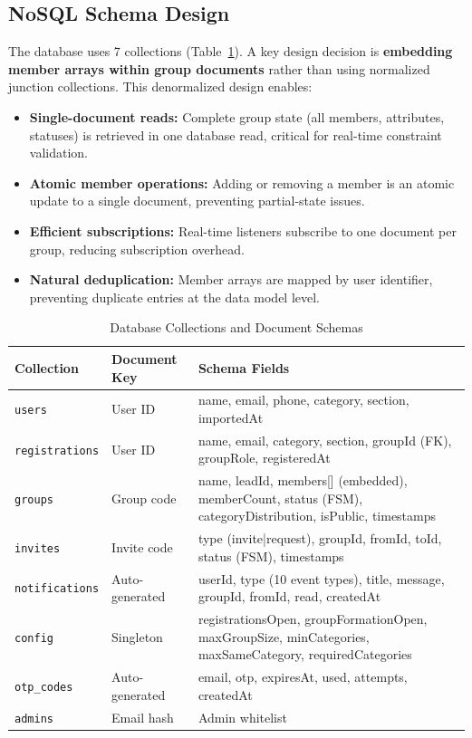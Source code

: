 \documentclass[11pt,a4paper]{article}
\theoremstyle{plain}
\theoremstyle{definition}
\theoremstyle{remark}
\begin{document}
\subsection{NoSQL Schema Design}

The database uses 7 collections (Table~\ref{tab:collections}). A key design decision is \textbf{embedding member arrays within group documents} rather than using normalized junction collections. This denormalized design enables:

\begin{itemize}[noitemsep,topsep=4pt]
    \item \textbf{Single-document reads:} Complete group state (all members, attributes, statuses) is retrieved in one database read, critical for real-time constraint validation.
    \item \textbf{Atomic member operations:} Adding or removing a member is an atomic update to a single document, preventing partial-state issues.
    \item \textbf{Efficient subscriptions:} Real-time listeners subscribe to one document per group, reducing subscription overhead.
    \item \textbf{Natural deduplication:} Member arrays are mapped by user identifier, preventing duplicate entries at the data model level.
\end{itemize}

\begin{table}[htbp]
\centering
\caption{Database Collections and Document Schemas}
\label{tab:collections}
\small
\renewcommand{\arraystretch}{1.15}
\begin{tabular}{@{}lp{2cm}p{5.5cm}@{}}
\toprule
\textbf{Collection} & \textbf{Document Key} & \textbf{Schema Fields} \\
\midrule
\texttt{users} & User ID & name, email, phone, category, section, importedAt \\
\texttt{registrations} & User ID & name, email, category, section, groupId (FK), groupRole, registeredAt \\
\texttt{groups} & Group code & name, leadId, members[] (embedded), memberCount, status (FSM), categoryDistribution, isPublic, timestamps \\
\texttt{invites} & Invite code & type (invite|request), groupId, fromId, toId, status (FSM), timestamps \\
\texttt{notifications} & Auto-generated & userId, type (10 event types), title, message, groupId, fromId, read, createdAt \\
\texttt{config} & Singleton & registrationsOpen, groupFormationOpen, maxGroupSize, minCategories, maxSameCategory, requiredCategories \\
\texttt{otp\_codes} & Auto-generated & email, otp, expiresAt, used, attempts, createdAt \\
\texttt{admins} & Email hash & Admin whitelist \\
\bottomrule
\end{tabular}
\end{table}
\end{document}
